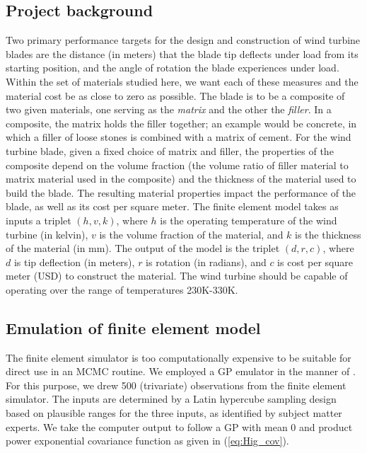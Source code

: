 \documentclass[12pt]{article}
\begin{document}
\subsection{Project background}

Two primary performance targets for the design and construction of wind turbine blades are the distance (in meters) that the blade tip deflects under load from its starting position, and the angle of rotation the blade experiences under load.
%
Within the set of materials studied here, we want each of these measures and the material cost be as close to zero as possible.
%
The blade is to be a composite of two given materials, one serving as the \textit{matrix} and the other the \textit{filler}. 
%
In a composite, the matrix holds the filler together; an example would be concrete, in which a filler of loose stones is combined with a matrix of cement.
%
For the wind turbine blade, given a fixed choice of matrix and filler, the properties of the composite depend on the volume fraction (the volume ratio of filler material to matrix material used in the composite) and the thickness of the material used to build the blade. 
%
The resulting material properties impact the performance of the blade, as well as its cost per square meter. 
%
The finite element model takes as inputs a triplet $(h,v,k)$, where $h$ is the operating temperature of the wind turbine (in kelvin), $v$ is the volume fraction of the material, and $k$ is the thickness of the material (in mm). 
%
The output of the model is the triplet $(d,r,c)$, where $d$ is tip deflection (in meters), $r$ is rotation (in radians), and $c$ is cost per square meter (USD) to construct the material.
% 
The wind turbine should be capable of operating over the range of temperatures 230K-330K. 
%

\subsection{Emulation of finite element model}\label{emulator}
The finite element simulator is too computationally expensive to be suitable for direct use in an MCMC routine. 
%
We employed a GP emulator in the manner of \cite{Williams2006}. 
%
For this purpose, we drew 500 (trivariate) observations from the finite element simulator. 
%
The inputs are determined by a Latin hypercube sampling design \citep{McKay1979} based on plausible ranges for the three inputs, as identified by subject matter experts.
%
We take the computer output to follow a GP with mean 0 and product power exponential covariance function as given in (\ref{eq:Hig_cov}).
%
\end{document}
